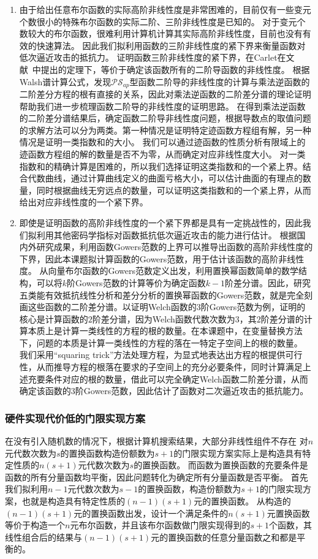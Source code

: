 \documentclass[a4paper,zihao=-4,AutoFakeBold]{ctexart}
\begin{document}
\begin{enumerate}[label=(\arabic{*})]
    \item 由于给出任意布尔函数的实际高阶非线性度是非常困难的，目前仅有一些变元个数很小的特殊布尔函数的实际二阶、三阶非线性度是已知的。
    对于变元个数较大的布尔函数，很难利用计算机计算其实际高阶非线性度，目前也没有有效的快速算法。
    因此我们拟利用函数的三阶非线性度的紧下界来衡量函数对低次逼近攻击的抵抗力。
    证明函数三阶非线性度的紧下界，在Carlet在文献~\cite{CC08IT}中提出的定理下，等价于确定该函数所有的二阶导函数的非线性度。
    根据Walsh谱计算公式，发现$\mathcal{PS}_{ap}$型函数二阶导的非线性度的计算与乘法逆函数的二阶差分方程的根有直接的关系，因此对乘法逆函数的二阶差分谱的理论证明帮助我们进一步梳理函数二阶导的非线性度的证明思路。
    在得到乘法逆函数的二阶差分谱结果后，确定函数二阶导非线性度问题，根据导数点的取值问题的求解方法可以分为两类。第一种情况是证明特定迹函数方程组有解，另一种情况是证明一类指数和的大小。
    我们可以通过迹函数的性质分析有限域上的迹函数方程组的解的数量是否不为零，从而确定对应非线性度大小。
    对一类指数和的精确计算是困难的，所以我们选择证明这类指数和的一个紧上界。结合代数曲线，通过计算曲线定义的曲面亏格大小，可以估计曲面的有理点的数量，同时根据曲线无穷远点的数量，可以证明这类指数和的一个紧上界，从而给出对应非线性度的一个紧下界。
    \item 即使是证明函数的高阶非线性度的一个紧下界都是具有一定挑战性的，因此我们拟利用其他密码学指标对函数抵抗低次逼近攻击的能力进行估计。
    根据国内外研究成果，利用函数Gowers范数的上界可以推导出函数的高阶非线性度的下界，因此本课题拟计算函数的Gowers范数，用于估计该函数的高阶非线性度。
    从向量布尔函数的Gowers范数定义出发，利用置换幂函数简单的数学结构，可以将$k$阶Gowers范数的计算等价为确定函数$k-1$阶差分谱。因此，研究五类能有效抵抗线性分析和差分分析的置换幂函数的Gowers范数，就是完全刻画这些函数的二阶差分谱。以证明Welch函数的$3$阶Gowers范数为例，证明的核心是计算函数的$2$阶差分谱，因为Welch函数代数次数为$3$，其$2$阶差分谱的计算本质上是计算一类线性的方程的根的数量。在本课题中，在变量替换方法下，问题的本质是计算一类线性的方程的落在一特定子空间上的根的数量。
    我们采用``squaring trick''方法处理方程，为显式地表达出方程的根提供可行性，从而推导方程的根落在要求的子空间上的充分必要条件，同时计算满足上述充要条件对应的根的数量，借此可以完全确定Welch函数二阶差分谱，从而确定该函数的$3$阶Gowers范数，因此估计了函数对二次逼近攻击的抵抗能力。
\end{enumerate}
\subsubsection{硬件实现代价低的门限实现方案}
在没有引入随机数的情况下，根据计算机搜索结果，大部分非线性组件不存在
对$n$元代数次数为$s$的置换函数构造份额数为$s+1$的门限实现方案实际上是构造具有特定性质的$n(s+1)$元代数次数为$s$的置换函数。
而函数为置换函数的充要条件是函数的所有分量函数均平衡，因此问题转化为确定所有分量函数是否平衡。
首先我们拟利用$n-1$元代数次数为$s-1$的置换函数，构造份额数为$s+1$的门限实现方案，也就是构造具有特定性质的$(n-1)(s+1)$元的置换函数。
从构造的$(n-1)(s+1)$元的置换函数出发，设计一个满足条件的$n(s+1)$元置换函数等价于构造一个$n$元布尔函数，并且该布尔函数做门限实现得到的$s+1$个函数，其线性组合后的结果与$(n-1)(s+1)$元的置换函数的任意分量函数之和都是平衡的。
\end{document}
